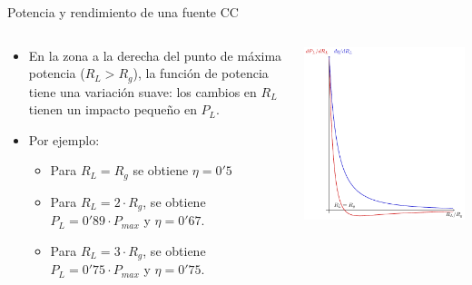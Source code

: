 \documentclass[aspectratio=169, usenames,svgnames,dvipsnames]{beamer}
\begin{document}
\begin{frame}[label={sec:org734eea0}]{Potencia y rendimiento de una fuente CC}
\begin{columns}
\begin{column}{0.5\columnwidth}
\begin{itemize}
\item En la zona a la derecha del punto de máxima potencia (\(R_L > R_g\)), la función de potencia tiene una variación suave: los cambios en \(R_L\) tienen un impacto pequeño en \(P_L\).
\item Por ejemplo:
\begin{itemize}
\item Para \(R_L = R_g\) se obtiene \(\eta = 0'5\)
\item Para \(R_L = 2\cdot R_g\), se obtiene \(P_L = 0'89 \cdot P_{max}\) y \(\eta = 0'67\).
\item Para \(R_L = 3\cdot R_g\), se obtiene \(P_L = 0'75 \cdot P_{max}\) y \(\eta = 0'75\).
\end{itemize}
\end{itemize}
\end{column}
\begin{column}{0.5\columnwidth}
\begin{center}
\includegraphics[height=0.85\textheight]{../figs/FuenteReal_DifPotencia.pdf}
\end{center}
\end{column}
\end{columns}
\end{frame}
\end{document}
